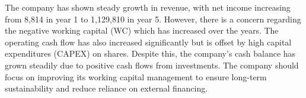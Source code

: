The company has shown steady growth in revenue, with net income increasing from 8,814 in year 1 to 1,129,810 in year 5. However, there is a concern regarding the negative working capital (WC) which has increased over the years. The operating cash flow has also increased significantly but is offset by high capital expenditures (CAPEX) on shares. Despite this, the company's cash balance has grown steadily due to positive cash flows from investments. The company should focus on improving its working capital management to ensure long-term sustainability and reduce reliance on external financing.